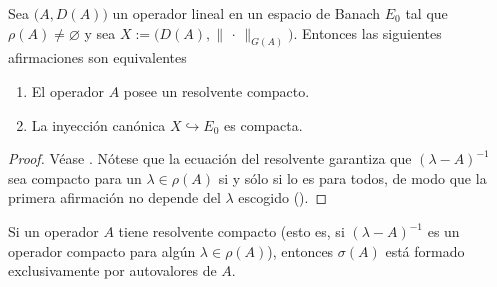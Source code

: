 \begin{Proposicion}
    \label{ch:semigrupos:section:estExp:prop:compRes}

    Sea $\big(A, D(A)\big)$ un operador lineal en un espacio de Banach $E_0$ tal que $\rho(A) \neq \varnothing$ y sea $X := \big(D(A), \lVert \, \cdot \, \rVert_{G(A)}\big)$\footnotemark. Entonces las siguientes afirmaciones son equivalentes

    \begin{enumerate}
        \item El operador $A$ posee un resolvente compacto.

        \item La inyección canónica $X \hookrightarrow E_0$ es compacta.
    \end{enumerate}
\end{Proposicion}

\begin{proof}
    Véase \cite[Proposición~5.8]{engel-2006-sho-cou-ope}. Nótese que la ecuación del resolvente garantiza que $(\lambda - A)^{-1}$ sea compacto para un $\lambda \in \rho(A)$ si y sólo si lo es para todos, de modo que la primera afirmación no depende del $\lambda$ escogido (\cite[Definición~5.7]{engel-2006-sho-cou-ope}).
\end{proof}

\begin{Corolario}
    \label{ch:semigrupos:section:estExp:cor:espectroResComp}

    Si un operador $A$ tiene resolvente compacto (esto es, si $(\lambda - A)^{-1}$ es un operador compacto para algún $\lambda \in \rho(A)$), entonces $\sigma(A)$ está formado exclusivamente por autovalores de $A$.
\end{Corolario}


